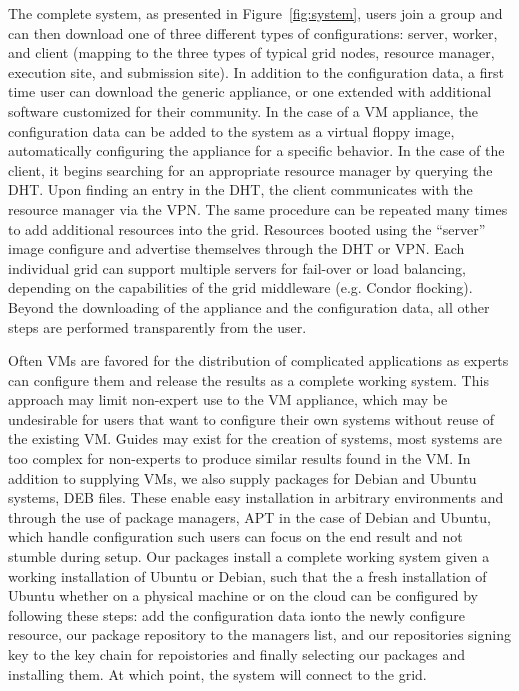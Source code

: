 \documentclass[conference]{IEEEtran}
\begin{document}
The complete system, as presented in Figure~\ref{fig:system}, users join a
group and can then download one of three different types of configurations:
server, worker, and client (mapping to the three types of typical grid nodes,
resource manager, execution site, and submission site).  In addition to the
configuration data, a first time user can download the generic appliance, or
one extended with additional software customized for their community.  In the
case of a VM appliance, the configuration data can be added to the system as a
virtual floppy image, automatically configuring the appliance for a specific
behavior.  In the case of the client, it begins searching for an appropriate
resource manager by querying the DHT.  Upon finding an entry in the DHT, the
client communicates with the resource manager via the VPN.  The same procedure
can be repeated many times to add additional resources into the grid.
Resources booted using the ``server'' image configure and advertise themselves
through the DHT or VPN.  Each individual grid can support multiple servers for
fail-over or load balancing, depending on the capabilities of the grid
middleware (e.g. Condor flocking).  Beyond the downloading of the appliance and
the configuration data, all other steps are performed transparently from the
user.

Often VMs are favored for the distribution of complicated applications as
experts can configure them and release the results as a complete working
system.  This approach may limit non-expert use to the VM appliance, which may
be undesirable for users that want to configure their own systems without reuse
of the existing VM.  Guides may exist for the creation of systems, most systems
are too complex for non-experts to produce similar results found in the VM.  In
addition to supplying VMs, we also supply packages for Debian and Ubuntu
systems, DEB files.  These enable easy installation in arbitrary environments
and through the use of package managers, APT in the case of Debian and Ubuntu,
which handle configuration such users can focus on the end result and not
stumble during setup.  Our packages install a complete working system given a
working installation of Ubuntu or Debian, such that the a fresh installation of
Ubuntu whether on a physical machine or on the cloud can be configured by
following these steps:  add the configuration data ionto the newly configure
resource, our package repository to the managers list, and our repositories
signing key to the key chain for repoistories and finally selecting our
packages and installing them.  At which point, the system will connect to the
grid.
\end{document}
